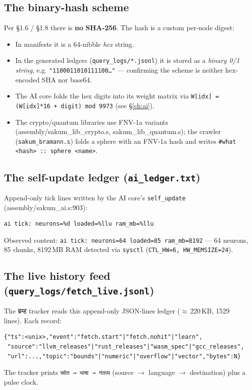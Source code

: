 \subsection{The binary-hash scheme}

Per \S1.6 / \S1.8 there is \textbf{no SHA-256}.  The hash is a custom
per-node digest:

\begin{itemize}
  \item In manifests it is a 64-nibble \emph{hex} string.
  \item In the generated ledgers (\texttt{query\_logs/*.jsonl}) it is stored
    as a \emph{binary 0/1 string}, e.g.
    \texttt{"1100011010111100\ldots"} --- confirming the scheme is neither
    hex-encoded SHA nor base64.
  \item The AI core folds the hex digits into its weight matrix via
    \texttt{W[idx] = (W[idx]*16 + digit) mod 9973} (see \S\ref{ch:ai}).
  \item The crypto/quantum libraries use FNV-1a variants
    (assembly/sakum\_lib\_crypto.s, sakum\_lib\_quantum.s); the crawler
    (\texttt{sakum\_bramann.s}) folds a sphere with an FNV-1a hash and
    writes \texttt{\#what <hash> :: sphere <name>}.
\end{itemize}

\subsection{The self-update ledger (\texttt{ai\_ledger.txt})}

Append-only tick lines written by the AI core's \texttt{self\_update}
(assembly/sakum\_ai.s:903):

\begin{verbatim}
ai tick: neurons=%d loaded=%llu ram_mb=%llu
\end{verbatim}

Observed content: \texttt{ai tick: neurons=64 loaded=85 ram\_mb=8192} ---
64 neurons, 85 chunks, 8192\,MB RAM detected via \texttt{sysctl}
(\texttt{CTL\_HW=6, HW\_MEMSIZE=24}).

\subsection{The live history feed (\texttt{query\_logs/fetch\_live.jsonl})}

The ब्रम्ह tracker reads this append-only JSON-lines ledger
($\approx$\,220\,KB, 1529 lines).  Each record:

\begin{verbatim}
{"ts":<unix>,"event":"fetch.start"|"fetch.nohit"|"learn",
 "source":"llvm_releases"|"rust_releases"|"wasm_spec"|"gcc_releases",
 "url":...,"topic":"bounds"|"numeric"|"overflow"|"vector","bytes":N}
\end{verbatim}

The tracker prints \texttt{स्रोत → भाषा → गंतव्य} (source $\to$ language
$\to$ destination) plus a pulse clock.
